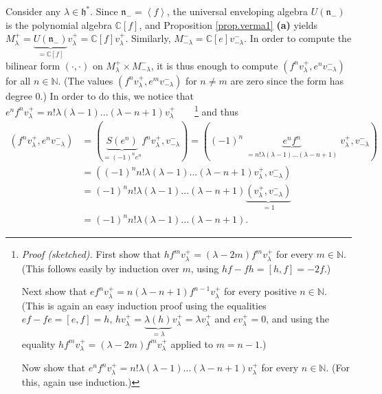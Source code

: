 \documentclass
[numbers=enddot,12pt,final,onecolumn,german,notitlepage]{scrartcl}%
\theoremstyle{definition}
\begin{document}
Consider any $\lambda\in\mathfrak{h}^{\ast}$. Since $\mathfrak{n}%
_{-}=\left\langle f\right\rangle $, the universal enveloping algebra $U\left(
\mathfrak{n}_{-}\right)  $ is the polynomial algebra $\mathbb{C}\left[
f\right]  $, and Proposition \ref{prop.verma1} \textbf{(a)} yields
$M_{\lambda}^{+}=\underbrace{U\left(  \mathfrak{n}_{-}\right)  }%
_{=\mathbb{C}\left[  f\right]  }v_{\lambda}^{+}=\mathbb{C}\left[  f\right]
v_{\lambda}^{+}$. Similarly, $M_{-\lambda}^{-}=\mathbb{C}\left[  e\right]
v_{-\lambda}^{-}$. In order to compute the bilinear form $\left(  \cdot
,\cdot\right)  $ on $M_{\lambda}^{+}\times M_{-\lambda}^{-}$, it is thus
enough to compute $\left(  f^{n}v_{\lambda}^{+},e^{n}v_{-\lambda}^{-}\right)
$ for all $n\in\mathbb{N}$. (The values $\left(  f^{n}v_{\lambda}^{+}%
,e^{m}v_{-\lambda}^{-}\right)  $ for $n\neq m$ are zero since the form has
degree $0$.) In order to do this, we notice that $e^{n}f^{n}v_{\lambda}%
^{+}=n!\lambda\left(  \lambda-1\right)  ...\left(  \lambda-n+1\right)
v_{\lambda}^{+}$\ \ \ \ \footnote{\textit{Proof (sketched).} First show that
$hf^{m}v_{\lambda}^{+}=\left(  \lambda-2m\right)  f^{m}v_{\lambda}^{+}$ for
every $m\in\mathbb{N}$. (This follows easily by induction over $m$, using
$hf-fh=\left[  h,f\right]  =-2f$.)
\par
Next show that $ef^{n}v_{\lambda}^{+}=n\left(  \lambda-n+1\right)
f^{n-1}v_{\lambda}^{+}$ for every positive $n\in\mathbb{N}$. (This is again an
easy induction proof using the equalities $ef-fe=\left[  e,f\right]  =h$,
$hv_{\lambda}^{+}=\underbrace{\lambda\left(  h\right)  }_{=\lambda}v_{\lambda
}^{+}=\lambda v_{\lambda}^{+}$ and $ev_{\lambda}^{+}=0$, and using the
equality $hf^{m}v_{\lambda}^{+}=\left(  \lambda-2m\right)  f^{m}v_{\lambda
}^{+}$ applied to $m=n-1$.)
\par
Now show that $e^{n}f^{n}v_{\lambda}^{+}=n!\lambda\left(  \lambda-1\right)
...\left(  \lambda-n+1\right)  v_{\lambda}^{+}$ for every $n\in\mathbb{N}$.
(For this, again use induction.)} and thus%
\begin{align*}
\left(  f^{n}v_{\lambda}^{+},e^{n}v_{-\lambda}^{-}\right)   &  =\left(
\underbrace{S\left(  e^{n}\right)  }_{=\left(  -1\right)  ^{n}e^{n}}%
f^{n}v_{\lambda}^{+},v_{-\lambda}^{-}\right)  =\left(  \left(  -1\right)
^{n}\underbrace{e^{n}f^{n}}_{\substack{=n!\lambda\left(  \lambda-1\right)
...\left(  \lambda-n+1\right)  }}v_{\lambda}^{+},v_{-\lambda}^{-}\right) \\
&  =\left(  \left(  -1\right)  ^{n}n!\lambda\left(  \lambda-1\right)
...\left(  \lambda-n+1\right)  v_{\lambda}^{+},v_{-\lambda}^{-}\right) \\
&  =\left(  -1\right)  ^{n}n!\lambda\left(  \lambda-1\right)  ...\left(
\lambda-n+1\right)  \underbrace{\left(  v_{\lambda}^{+},v_{-\lambda}%
^{-}\right)  }_{=1}\\
&  =\left(  -1\right)  ^{n}n!\lambda\left(  \lambda-1\right)  ...\left(
\lambda-n+1\right)  .
\end{align*}
\end{document}
